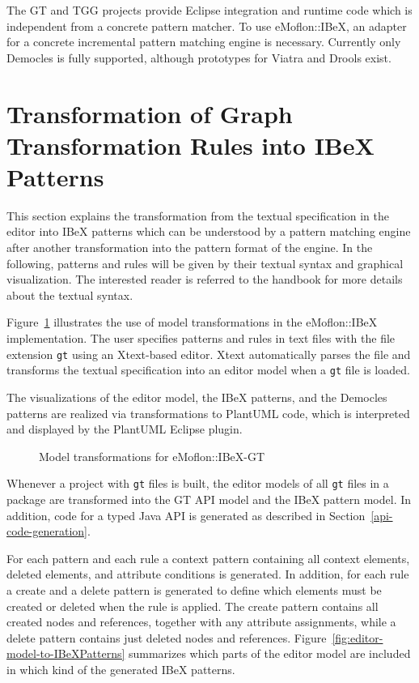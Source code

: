 The GT and TGG projects provide Eclipse integration and runtime code which is independent from a concrete pattern matcher.
To use eMoflon::IBeX, an adapter for a concrete incremental pattern matching engine is necessary.
Currently only Democles \cite{Democles} is fully supported, although prototypes for Viatra and Drools exist.


\section{Transformation of Graph Transformation Rules into IBeX Patterns}
\label{ibex-patterns}
This section explains the transformation from the textual specification in the editor into IBeX patterns which can be understood by a pattern matching engine after another transformation into the pattern format of the engine.
In the following, patterns and rules will be given by their textual syntax and graphical visualization.
The interested reader is referred to the handbook \cite{eMoflonIBeX-GT-Handbook} for more details about the textual syntax.

Figure~\ref{fig:model-transformations} illustrates the use of model transformations in the eMoflon::IBeX implementation.
The user specifies patterns and rules in text files with the file extension \texttt{gt} using an Xtext-based editor.
Xtext automatically parses the file and transforms the textual specification into an editor model when a \texttt{gt} file is loaded.

The visualizations of the editor model, the IBeX patterns, and the Democles patterns are realized via transformations to PlantUML code, which is interpreted and displayed by the PlantUML Eclipse plugin.

\begin{figure}[h!]
	\centering
	
	\caption{Model transformations for eMoflon::IBeX-GT}
	\label{fig:model-transformations}
\end{figure}

\noindent
Whenever a project with \texttt{gt} files is built, the editor models of all \texttt{gt} files in a package are transformed into the GT API model and the IBeX pattern model.
In addition, code for a typed Java API is generated as described in Section~\ref{api-code-generation}.

For each pattern and each rule a context pattern containing all context elements, deleted elements, and attribute conditions is generated.
In addition, for each rule a create and a delete pattern is generated to define which elements must be created or deleted when the rule is applied.
The create pattern contains all created nodes and references, together with any attribute assignments, while a delete pattern contains just deleted nodes and references.
Figure~\ref{fig:editor-model-to-IBeXPatterns} summarizes which parts of the editor model are included in which kind of the generated IBeX patterns.

